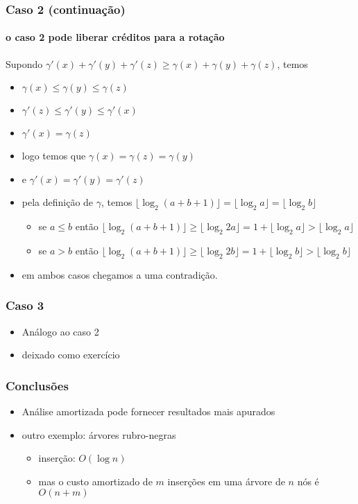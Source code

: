 \documentclass{beamer}
\begin{document}
\begin{frame}

\frametitle{Caso 2 (continuação)}
\framesubtitle{o caso 2 pode liberar créditos para a rotação}

Supondo
$\gamma'(x) + \gamma'(y) + \gamma'(z) \ge \gamma(x) + \gamma(y) + \gamma(z)$,
temos
\begin{itemize}
\item $\gamma(x) \le \gamma(y) \le \gamma(z)$
\item $\gamma'(z) \le \gamma'(y) \le \gamma'(x)$
\item $\gamma'(x) = \gamma(z)$
\item logo temos que $\gamma(x) = \gamma(z) = \gamma(y)$
\item e $\gamma'(x) = \gamma'(y) = \gamma'(z)$
\item pela definição de $\gamma$, temos
$\lfloor \log_2 (a + b + 1) \rfloor = \lfloor \log_2 a \rfloor = \lfloor \log_2 b \rfloor$
\begin{itemize}
\item se $a \le b$ então $\lfloor \log_2 (a+b+1) \rfloor \ge \lfloor \log_2 2a \rfloor = 1 + \lfloor \log_2 a \rfloor > \lfloor \log_2 a \rfloor$
\item se $a > b$ então $\lfloor \log_2 (a+b+1) \rfloor \ge \lfloor \log_2 2b \rfloor = 1 + \lfloor \log_2 b \rfloor > \lfloor \log_2 b \rfloor$
\end{itemize}
\item em ambos casos chegamos a uma contradição.
\end{itemize}
\end{frame}

\begin{frame}

\frametitle{Caso 3}

\begin{itemize}
\item Análogo ao caso 2
\item deixado como exercício
\end{itemize}

\end{frame}

\begin{frame}

\frametitle{Conclusões}

\begin{itemize}
\item Análise amortizada pode fornecer resultados mais apurados
\item outro exemplo: árvores rubro-negras
\begin{itemize}
\item inserção: $O(\log n)$
\item mas o custo amortizado de $m$ inserções em uma árvore de $n$ nós
  é $O(n+m)$
\end{itemize}
\end{itemize}

\end{frame}
\end{document}
